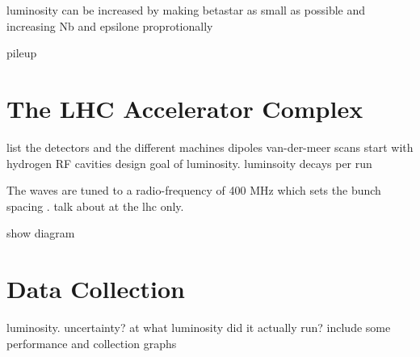 luminosity can be increased by making betastar as small as possible
and increasing Nb and epsilone proprotionally


pileup

\section{The LHC Accelerator Complex}
list the detectors and the different machines
dipoles
van-der-meer scans
start with hydrogen
RF cavities
design goal of luminosity. luminsoity decays per run

The waves are tuned to a radio-frequency of 400 MHz which sets the bunch spacing .  talk about at the lhc only.

show diagram
\section{Data Collection}

luminosity. uncertainty?
at what luminosity did it actually run?
include some performance and collection graphs
